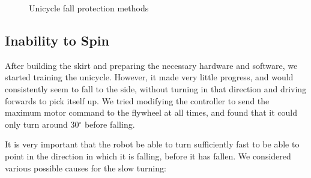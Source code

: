 \documentclass{IIBproject}
\begin{document}
\begin{figure}[htpb]
  \begin{center}
    \end{center}
    \caption{Unicycle fall protection methods}
    \label{fig:fall_protection}
    \end{figure}

\subsection{Inability to Spin}

After building the skirt and preparing the necessary hardware and software, we
started training the unicycle. However, it made very little progress, and
would consistently seem to fall to the side, without turning in that direction
and driving forwards to pick itself up. We tried modifying the controller to
send the maximum motor command to the flywheel at all times, and found that it
could only turn around 30$^\circ$ before falling.

It is very important that the robot be able to turn sufficiently fast to be
able to point in the direction in which it is falling, before it has fallen.
We considered various possible causes for the slow turning:
\end{document}
